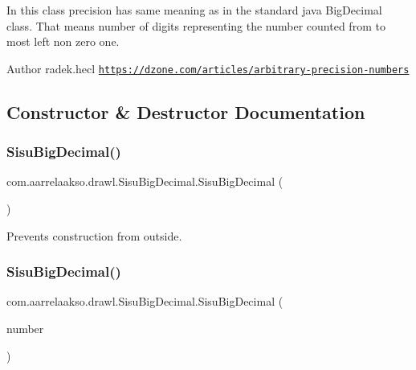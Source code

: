 In this class precision has same meaning as in the standard java Big\+Decimal class. That means number of digits representing the number counted from to most left non zero one.

\begin{DoxyAuthor}{Author}
radek.\+hecl  \href{https://dzone.com/articles/arbitrary-precision-numbers}{\tt https\+://dzone.\+com/articles/arbitrary-\/precision-\/numbers} 
\end{DoxyAuthor}


\subsection{Constructor \& Destructor Documentation}
\mbox{\label{classcom_1_1aarrelaakso_1_1drawl_1_1_sisu_big_decimal_a67a8c41e95f12142516f7a8f8736386a}} 
\subsubsection{\texorpdfstring{Sisu\+Big\+Decimal()}{SisuBigDecimal()}\hspace{0.1cm}{\footnotesize\ttfamily [1/3]}}
{\footnotesize\ttfamily com.\+aarrelaakso.\+drawl.\+Sisu\+Big\+Decimal.\+Sisu\+Big\+Decimal (\begin{DoxyParamCaption}{ }\end{DoxyParamCaption})\hspace{0.3cm}{\ttfamily [private]}}

Prevents construction from outside. \mbox{\label{classcom_1_1aarrelaakso_1_1drawl_1_1_sisu_big_decimal_a2073791c3fc4e6d6cbbd9a6e7b83e295}} 
\subsubsection{\texorpdfstring{Sisu\+Big\+Decimal()}{SisuBigDecimal()}\hspace{0.1cm}{\footnotesize\ttfamily [2/3]}}
{\footnotesize\ttfamily com.\+aarrelaakso.\+drawl.\+Sisu\+Big\+Decimal.\+Sisu\+Big\+Decimal (\begin{DoxyParamCaption}\item[{Big\+Decimal}]{number }\end{DoxyParamCaption})\hspace{0.3cm}{\ttfamily [protected]}}

